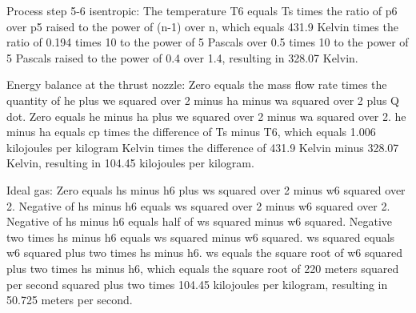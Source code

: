 Process step 5-6 isentropic:
The temperature T6 equals Ts times the ratio of p6 over p5 raised to the power of (n-1) over n, which equals 431.9 Kelvin times the ratio of 0.194 times 10 to the power of 5 Pascals over 0.5 times 10 to the power of 5 Pascals raised to the power of 0.4 over 1.4, resulting in 328.07 Kelvin.

Energy balance at the thrust nozzle:
Zero equals the mass flow rate times the quantity of he plus we squared over 2 minus ha minus wa squared over 2 plus Q dot.
Zero equals he minus ha plus we squared over 2 minus wa squared over 2.
he minus ha equals cp times the difference of Ts minus T6, which equals 1.006 kilojoules per kilogram Kelvin times the difference of 431.9 Kelvin minus 328.07 Kelvin, resulting in 104.45 kilojoules per kilogram.

Ideal gas:
Zero equals hs minus h6 plus ws squared over 2 minus w6 squared over 2.
Negative of hs minus h6 equals ws squared over 2 minus w6 squared over 2.
Negative of hs minus h6 equals half of ws squared minus w6 squared.
Negative two times hs minus h6 equals ws squared minus w6 squared.
ws squared equals w6 squared plus two times hs minus h6.
ws equals the square root of w6 squared plus two times hs minus h6, which equals the square root of 220 meters squared per second squared plus two times 104.45 kilojoules per kilogram, resulting in 50.725 meters per second.